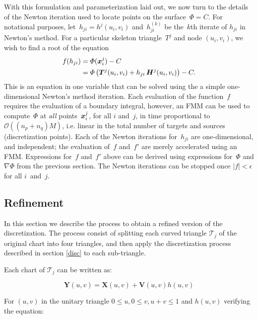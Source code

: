 \documentclass[11pt]{article}
\numberwithin{equation}{section}
\newcommand{\vct}{\vectorsym}
\newcommand{\lp}{\left(}
\newcommand{\rp}{\right)}
\newcommand\bx{\vct{x}}
\newcommand\bX{\boldsymbol X}
\newcommand\bY{\boldsymbol Y}
\newcommand\bV{\boldsymbol V}
\newcommand{\cO}{\mathcal O}
\begin{document}
With this formulation and parameterization laid out, we now turn to
the details of the Newton iteration used to locate points on the
surface~$\Phi = C$.  For notational purposes,
let~$h_{ji} = h^j(u_i,v_i)$ and~$h^{(k)}_{ji}$ be the~$k$th iterate of
$h_{ji}$ in Newton's method. For a particular skeleton triangle~$T^j$
and node $(u_i,v_i)$, we wish to find a root of the equation
\begin{equation}\label{newtoneq}
  \begin{aligned}
    f(h_{ji}) &= \Phi(\bx^j_i) - C \\
    &= \Phi\lp \vct{T}^j(u_i,v_i) + h_{ji} \, \vct{H}^j(u_i,v_i)
    \rp - C.
\end{aligned}
\end{equation}
This is an equation in one variable that can be solved using the a
simple one-dimensional Newton's method iteration.
Each evaluation of the function~$f$ requires the evaluation of a
boundary integral, however, an FMM can be used to compute~$\Phi$ at
\emph{all} points~$\bx^j_i$, for all $i$ and~$j$, in time proportional
to~$\cO \lp (n_p+n_q)M \rp$, i.e. linear in the total number of
targets and sources (discretization points).  Each of the Newton
iterations for~$h_{ji}$ are one-dimensional, and independent; the
evaluation of~$f$ and~$f'$ are merely accelerated using an
FMM. Expressions for~$f$ and~$f'$ above can be derived using
expressions for~$\Phi$ and $\nabla \Phi$ from the previous section.
The Newton iterations can be stopped once $|f| < \epsilon$ for all
$i$~and~$j$.





\subsection{Refinement}

In this section we describe the process to obtain a refined version of the discretization. The process consist of splitting each curved triangle  $\mathcal{T}_j$ of the original chart into four triangles, and then apply the discretization process described in section \ref{disc} to each sub-triangle.

Each chart of $\mathcal{T}_j$ can be written as:

\begin{equation}
\bY(u,v)=\bX(u,v)+\bV(u,v)h(u,v)
\end{equation}

For $(u,v)$ in the unitary triangle $0\le u, 0\le v, u+v\le1$ and $h(u,v)$ verifying the equation:
\end{document}
